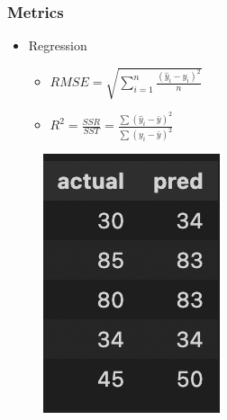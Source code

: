 \begin{frame}\frametitle{Metrics}
   \begin{minipage}{0.58\linewidth}
      \begin{itemize}
         \item Regression
         \begin{itemize}
            \item $RMSE = \sqrt{\sum_{i=1}^n{\frac{(\hat{y}_i-y_i)^2}{n}}}$
            \vspace{.2cm}
            \item $R^2 = \frac{SSR}{SST} = \frac{\sum(\hat{y}_i-\bar{y})^2}{\sum(y_i-\bar{y})^2}$
         \end{itemize}
      \end{itemize}
   \end{minipage}
   \begin{minipage}{0.38\linewidth}
      \begin{figure}[H]
         \includegraphics[scale=.37]{../images/illustrations/model_results_regression.png}
      \end{figure}
   \end{minipage}
   

\end{frame}
